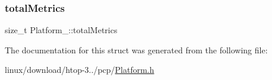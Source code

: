 \mbox{\label{structPlatform___a6cb286564fbef36dad84afc8a83c4cc1}} 
\subsubsection{\texorpdfstring{total\+Metrics}{totalMetrics}}
{\footnotesize\ttfamily size\+\_\+t Platform\+\_\+\+::total\+Metrics}



The documentation for this struct was generated from the following file\+:\begin{DoxyCompactItemize}
\item 
linux/download/htop-\/3../pcp/\hyperlink{pcp_2Platform_8h}{Platform.\+h}\end{DoxyCompactItemize}
